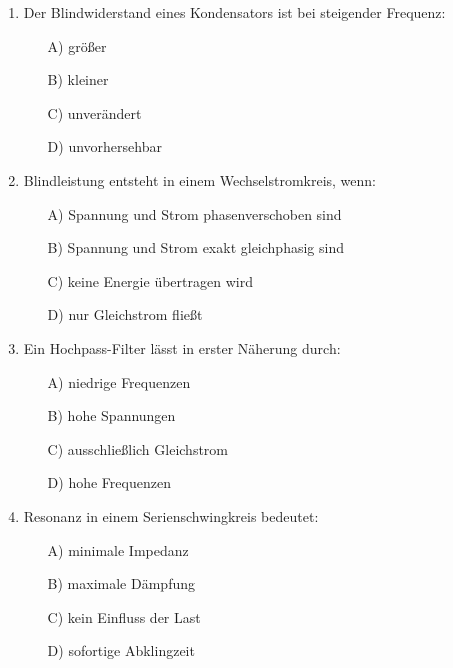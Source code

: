 \documentclass[a4paper,12pt]{article}
\newif\ifshowsolutions
\begin{document}
\begin{enumerate}[label=\textbf{\arabic*.}, leftmargin=*, itemsep=8pt]
\ifshowsolutions
Lösung: C
\fi

  \item Der Blindwiderstand eines Kondensators ist bei steigender Frequenz:
    \begin{itemize}[label=$\square$]
      \item[A)] größer
      \item[B)] kleiner
      \item[C)] unverändert
      \item[D)] unvorhersehbar
    \end{itemize}

\ifshowsolutions
Lösung: B
\fi

  \item Blindleistung entsteht in einem Wechselstromkreis, wenn:
    \begin{itemize}[label=$\square$]
      \item[A)] Spannung und Strom phasenverschoben sind
      \item[B)] Spannung und Strom exakt gleichphasig sind
      \item[C)] keine Energie übertragen wird
      \item[D)] nur Gleichstrom fließt
    \end{itemize}

\ifshowsolutions
Lösung: A
\fi

  \item Ein Hochpass-Filter lässt in erster Näherung durch:
    \begin{itemize}[label=$\square$]
      \item[A)] niedrige Frequenzen
      \item[B)] hohe Spannungen
      \item[C)] ausschließlich Gleichstrom
      \item[D)] hohe Frequenzen
    \end{itemize}

\ifshowsolutions
Lösung: D
\fi

  \item Resonanz in einem Serienschwingkreis bedeutet:
    \begin{itemize}[label=$\square$]
      \item[A)] minimale Impedanz
      \item[B)] maximale Dämpfung
      \item[C)] kein Einfluss der Last
      \item[D)] sofortige Abklingzeit
    \end{itemize}


\end{enumerate}
\end{document}
